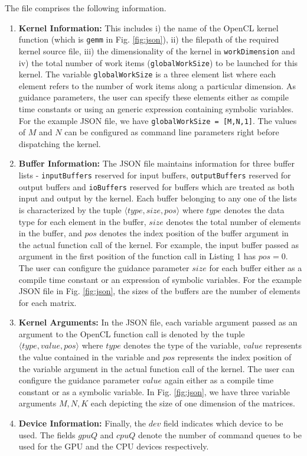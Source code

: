     The file comprises the following information.
	\begin{enumerate}
		\item \textbf{Kernel Information: } This includes i) the name of the OpenCL kernel function (which is {\tt gemm} in Fig. \ref{fig:json}), ii) the filepath of the required kernel source file, iii) the dimensionality of the kernel in {\tt workDimension} and iv) the total number of work items ({\tt globalWorkSize}) to be launched for this kernel. The variable {\tt globalWorkSize} is a three element list where each element refers to the number of work items along a particular dimension. As guidance parameters, the user can specify these elements either as compile time constants or using an generic expression containing symbolic variables. For the example JSON file, we have {\tt globalWorkSize = [M,N,1]}. The values of $M$ and $N$ can be configured  as command line parameters right before dispatching the kernel.  
		\item  \textbf{Buffer Information: }  The JSON file maintains information for three buffer lists - {\tt inputBuffers} reserved for input buffers, {\tt outputBuffers} reserved for output buffers and {\tt ioBuffers} reserved for buffers which are treated as both input and output  by the kernel. Each buffer belonging to any one of the lists is characterized by the tuple $\langle type, size ,pos \rangle$ where $type$ denotes the data type for each element in the buffer, $size$ denotes the total number of elements in the buffer, and $pos$ denotes the index position of the buffer argument in the actual function call of the kernel. For example, the input buffer passed as argument in the first position of the function call in Listing 1 has  $pos=0$. The user can configure the guidance parameter $size$ for each buffer either as a compile time constant or an expression of symbolic variables. For the example JSON file in Fig. \ref{fig:json}, the sizes of the buffers are the number of elements for each matrix. 
		\item \textbf{Kernel Arguments: } In the JSON file, each variable argument passed as an argument to the OpenCL function call is denoted by the tuple $\langle type, value, pos\rangle$  where $type$ denotes the type of the variable, $value$ represents the value contained in the variable and $pos$ represents the index position of the variable argument in the actual function call of the kernel. The user can configure the guidance parameter $value$  again either as a compile time constant or as a symbolic variable. In Fig. \ref{fig:json}, we have three variable arguments $M,N,K$ each depicting the size of one dimension of the matrices.
		\item \textbf{Device Information: } Finally, the $dev$ field indicates which device to be used. The fields $gpuQ$ and $cpuQ$ denote the number of command queues to be used for the GPU and the CPU devices respectively.
    \end{enumerate}
    
